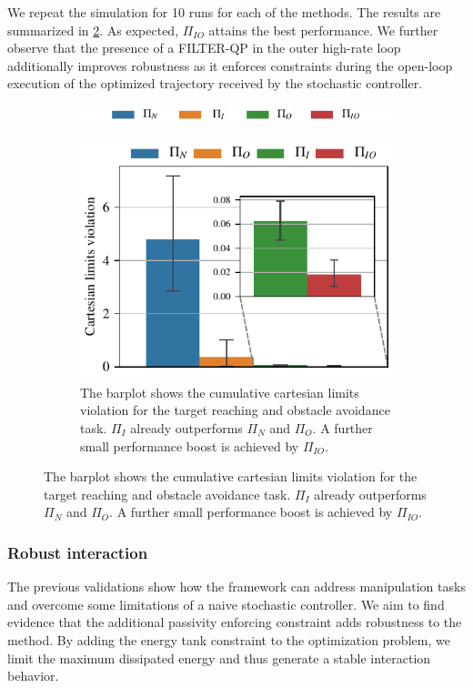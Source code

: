 We repeat the simulation for 10 runs for each of the methods. The results are summarized in \fig \ref{fig:obstacle_avoidance}. As expected, $\Pi_{IO}$ attains the best performance. We further observe that the presence of a FILTER-QP in the outer high-rate loop additionally improves robustness as it enforces constraints during the open-loop execution of the optimized trajectory received by the stochastic controller. 
\begin{figure}[t]
\begin{subfigure}{1\columnwidth}
    \includegraphics[width=\linewidth]{figures/methods_comparison/legend.pdf}
\end{subfigure}%
\hfill

\begin{subfigure}{1\columnwidth}
    \includegraphics[width=0.7\columnwidth]{figures/obstacle_avoidance/obstacle_avoidance_test.pdf}
    \caption{The barplot shows the cumulative cartesian limits violation for the target reaching and obstacle avoidance task. $\Pi_{I}$ already outperforms $\Pi_{N}$ and $\Pi_{O}$. A further small performance boost is achieved by $\Pi_{IO}$.}
    \label{fig:obstacle_avoidance}
\end{subfigure}
\end{figure}

\vspace{0.3cm}
\subsubsection{Robust interaction}
The previous validations show how the framework can address manipulation tasks and overcome some limitations of a naive stochastic controller. We aim to find evidence that the additional passivity enforcing constraint adds robustness to the method. By adding the energy tank constraint to the optimization problem, we limit the maximum dissipated energy and thus generate a stable interaction behavior.

